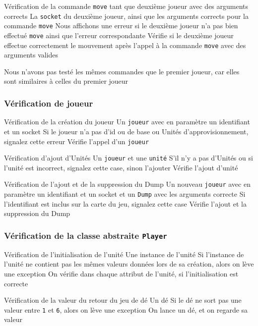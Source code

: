 \mytest
{Vérification de la commande {\tt move} tant que deuxième joueur avec des arguments corrects}
{La {\tt socket} du deuxième joueur, ainsi que les arguments corrects pour la commande {\tt move}}
{Nous affichons une erreur si le deuxième joueur n'a pas bien effectué {\tt move} ainsi que l'erreur correspondante}
{Vérifie si le deuxième joueur effectue correctement le mouvement après l'appel à la commande {\tt move} avec des arguments valides}

Nous n'avons pas testé les mêmes commandes que le premier joueur, car elles sont similaires à celles du premier joueur



\subsubsection{Vérification de joueur}

\mytest
{Vérification de la création du joueur }
{Un  {\tt joueur} avec en paramètre un identifiant et un socket}
{Si le joueur n'a pas d'id ou de base ou Unités d'approvisionnement, signalez cette erreur}
{Vérifie l'appel d'un {\tt joueur}}


\mytest
{Vérification d'ajout d'Unités }
{Un {\tt joueur} et une {\tt unité}}
{S'il n'y a pas d'Unités ou si l'unité est incorrect, signalez cette case, sinon l'ajouter}
{Vérifie l'ajout d'unité}


\mytest
{Vérification de l'ajout et de la suppression du Dump }
{Un nouveau {\tt joueur} avec en paramètre un identifiant et un socket et un {\tt Dump} avec les arguments correcte}
{Si l'identifiant est inclus sur la carte du jeu, signalez cette case}
{Vérifie l'ajout et la suppression du Dump}


\subsubsection{Vérification de la classe abstraite {\tt Player}}

\mytest
{Vérification de l'initialisation de l'unité}
{Une instance de l'unité}
{Si l'instance de l'unité ne contient pas les mêmes valeurs données lors de sa création, alors on lève une exception}
{On vérifie dans chaque attribut de l'unité, si l'initialisation est correcte}

\mytest
{Vérification de la valeur du retour du jeu de dé}
{Un dé}
{Si le dé ne sort pas une valeur entre \texttt{1} et \texttt{6}, alors on lève une exception}
{On lance un dé, et on regarde sa valeur}

